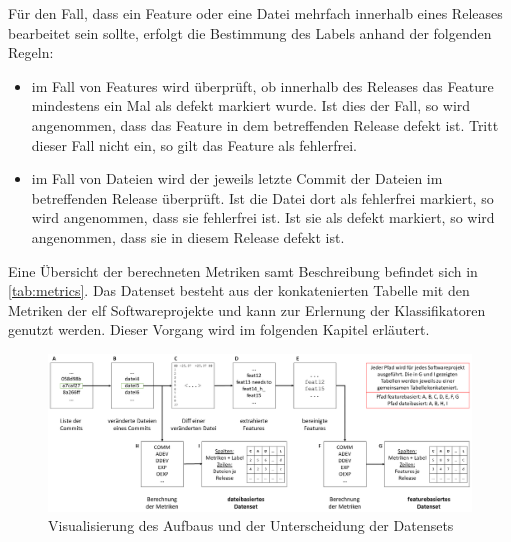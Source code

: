 Für den Fall, dass ein Feature oder eine Datei mehrfach innerhalb eines Releases bearbeitet sein sollte, erfolgt die Bestimmung des Labels anhand der folgenden Regeln:

\begin{itemize}
\setlength{\itemsep}{-2pt}
\item im Fall von Features wird überprüft, ob innerhalb des Releases das Feature mindestens ein Mal als \glqq defekt\grqq{} markiert wurde. Ist dies der Fall, so wird angenommen, dass das Feature in dem betreffenden Release defekt ist. Tritt dieser Fall nicht ein, so gilt das Feature als fehlerfrei.
\item im Fall von Dateien wird der jeweils letzte Commit der Dateien im betreffenden Release überprüft. Ist die Datei dort als \glqq fehlerfrei\grqq{} markiert, so wird angenommen, dass sie fehlerfrei ist. Ist sie als \glqq defekt\grqq{} markiert, so wird angenommen, dass sie in diesem Release defekt ist.
\end{itemize}


Eine Übersicht der berechneten Metriken samt Beschreibung befindet sich in \autoref{tab:metrics}. Das Datenset besteht aus der konkatenierten Tabelle mit den Metriken der elf Softwareprojekte und kann zur Erlernung der Klassifikatoren genutzt werden. Dieser Vorgang wird im folgenden Kapitel erläutert.

\begin{figure}[H]
    \centering
    \includegraphics[width=\textwidth]{images/Dataset}
    \caption{Visualisierung des Aufbaus und der Unterscheidung der Datensets\label{fig:dataset}}
\end{figure}

